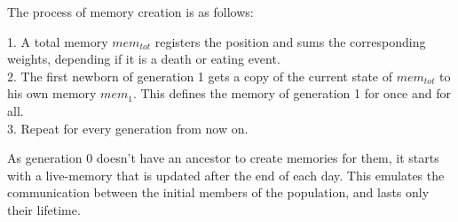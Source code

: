 \documentclass[a4paper,prd,twocolumn,nofootinbib,superscriptaddress,floatfix]{revtex4}
\begin{document}
The process of memory creation is as follows:

1.  A total memory  \textit{$mem_{tot}$} registers the position and sums the corresponding weights, depending if it is a death or eating event.\\
2. The first newborn of generation 1 gets a copy of the current state of \textit{$mem_{tot}$} to his own memory \textit{$mem_1$}. This defines the memory of generation 1 for once and for all.\\
3. Repeat for every generation from now on.


As generation 0 doesn't have an ancestor to create memories for them, it starts with a live-memory that is updated after the end of each day. This emulates the communication between the initial members of the population, and lasts only their lifetime.
\setcounter{figure}{1}
\end{document}
